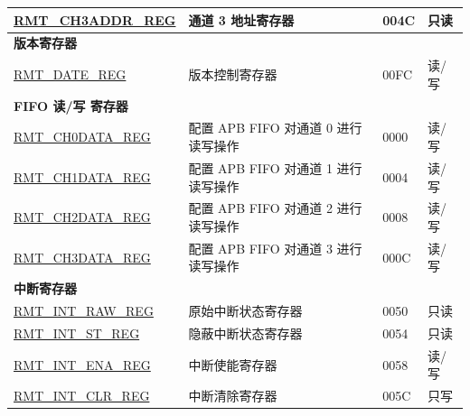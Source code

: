 \begin{longtable}{ | p{6cm} | p{6cm} | p{2cm} | p{1cm} | }
\hyperref[regdesc:RMTCHNADDRREG]{RMT\_CH3ADDR\_REG} & 通道 3 地址寄存器 & \hexprefix{}004C & 只读 \\ \hline
\multicolumn{4}{|l|}{\textbf{版本寄存器}} \\ \hline
\hyperref[regdesc:RMTDATEREG]{RMT\_DATE\_REG} & 版本控制寄存器 & \hexprefix{}00FC & 读/写 \\ \hline
\multicolumn{4}{|l|}{\textbf{FIFO 读/写 寄存器}} \\ \hline
\hyperref[regdesc:RMTCHNDATAREG]{RMT\_CH0DATA\_REG} & 配置 APB FIFO 对通道 0 进行读写操作 & \hexprefix{}0000 & 读/写 \\ \hline
\hyperref[regdesc:RMTCHNDATAREG]{RMT\_CH1DATA\_REG} & 配置 APB FIFO 对通道 1 进行读写操作 & \hexprefix{}0004 & 读/写 \\ \hline
\hyperref[regdesc:RMTCHNDATAREG]{RMT\_CH2DATA\_REG} & 配置 APB FIFO 对通道 2 进行读写操作 & \hexprefix{}0008 & 读/写 \\ \hline
\hyperref[regdesc:RMTCHNDATAREG]{RMT\_CH3DATA\_REG} & 配置 APB FIFO 对通道 3 进行读写操作 & \hexprefix{}000C & 读/写 \\ \hline
\multicolumn{4}{|l|}{\textbf{中断寄存器}} \\ \hline
\hyperref[regdesc:RMTINTRAWREG]{RMT\_INT\_RAW\_REG} & 原始中断状态寄存器 & \hexprefix{}0050 & 只读 \\ \hline
\hyperref[regdesc:RMTINTSTREG]{RMT\_INT\_ST\_REG} & 隐蔽中断状态寄存器 & \hexprefix{}0054 & 只读 \\ \hline
\hyperref[regdesc:RMTINTENAREG]{RMT\_INT\_ENA\_REG} & 中断使能寄存器 & \hexprefix{}0058 & 读/写 \\ \hline
\hyperref[regdesc:RMTINTCLRREG]{RMT\_INT\_CLR\_REG} & 中断清除寄存器 & \hexprefix{}005C & 只写 \\ \hline
\end{longtable}

